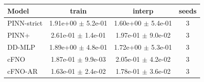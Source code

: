 \begin{tabular}{lccc}
\toprule
Model & train & interp & seeds \\
\midrule
PINN-strict & 1.91e+00 $\pm$ 5.2e-01 & 1.60e+00 $\pm$ 5.4e-01 & 3 \\
PINN+ & 2.61e-01 $\pm$ 1.4e-01 & 1.97e-01 $\pm$ 9.0e-02 & 3 \\
DD-MLP & 1.89e+00 $\pm$ 4.8e-01 & 1.72e+00 $\pm$ 5.3e-01 & 3 \\
cFNO & 1.87e-01 $\pm$ 9.9e-03 & 2.05e-01 $\pm$ 4.2e-02 & 3 \\
cFNO-AR & 1.63e-01 $\pm$ 2.4e-02 & 1.78e-01 $\pm$ 3.6e-02 & 3 \\
\bottomrule
\end{tabular}
